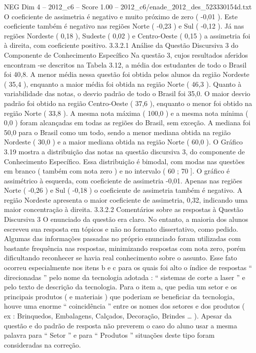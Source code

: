 \begin{textsample}{NEG Dim 4 – 2012\_c6 – Score 1.00 – 2012\_c6/enade\_2012\_des\_523330154d.txt}
O coeficiente de assimetria é negativo e muito próximo de zero ( -0,01 ).
Este coeficiente também é negativo nas regiões Norte ( -0,23 ) e Sul ( -0,12 ).
Já nas regiões Nordeste ( 0,18 ), Sudeste ( 0,02 ) e Centro-Oeste ( 0,15 ) a assimetria foi à direita, com coeficiente positivo. 3.3.2.1 Análise da Questão Discursiva 3 do Componente de Conhecimento Específico Na questão 3, cujos resultados aferidos encontram -se descritos na Tabela 3.12, a média dos estudantes de todo o Brasil foi 40,8.
A menor média nessa questão foi obtida pelos alunos da região Nordeste ( 35,4 ), enquanto a maior média foi obtida na região Norte ( 46,3 ).
Quanto à variabilidade das notas, o desvio padrão de todo o Brasil foi 35,0.
O maior desvio padrão foi obtido na região Centro-Oeste ( 37,6 ), enquanto o menor foi obtido na região Norte ( 33,8 ).
A mesma nota máxima ( 100,0 ) e a mesma nota mínima ( 0,0 ) foram alcançadas em todas as regiões do Brasil, sem exceção.
A mediana foi 50,0 para o Brasil como um todo, sendo a menor mediana obtida na região Nordeste ( 30,0 ) e a maior mediana obtida na região Norte ( 60,0 ).
O Gráfico 3.19 mostra a distribuição das notas na questão discursiva 3, do componente de Conhecimento Específico.
Essa distribuição é bimodal, com modas nas questões em branco ( também com nota zero ) e no intervalo ( 60 ; 70 ].
O gráfico é assimétrico à esquerda, com coeficiente de assimetria -0,01.
Apenas nas regiões Norte ( -0,26 ) e Sul ( -0,18 ) o coeficiente de assimetria também é negativo.
A região Nordeste apresenta o maior coeficiente de assimetria, 0,32, indicando uma maior concentração à direita. 3.3.2.2 Comentários sobre as respostas à Questão Discursiva 3 O enunciado da questão era claro.
No entanto, a maioria dos alunos escreveu sua resposta em tópicos e não no formato dissertativo, como pedido.
Algumas das informações passadas no próprio enunciado foram utilizadas com bastante frequência nas respostas, minimizando respostas com nota zero, porém dificultando reconhecer se havia real conhecimento sobre o assunto.
Esse fato ocorreu especialmente nos itens b e c para os quais foi alto o índice de respostas “ direcionadas ” pelo nome da tecnologia adotada : “ sistemas de corte a laser ” e pelo texto de descrição da tecnologia.
Para o item a, que pedia um setor e os principais produtos ( e materiais ) que poderiam se beneficiar da tecnologia, houve uma enorme “ coincidência ” entre os nomes dos setores e dos produtos ( ex : Brinquedos, Embalagens, Calçados, Decoração, Brindes … ).
Apesar da questão e do padrão de resposta não preverem o caso do aluno usar a mesma palavra para “ Setor ” e para “ Produtos ” situações deste tipo foram consideradas na correção.

\end{textsample}
